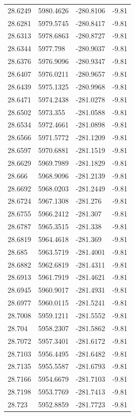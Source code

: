 \begin{table}[H]
\begin{tabular}{llll}
28.6249 & 5980.4626 & -280.8106 & -9.81 \\
28.6281 & 5979.5745 & -280.8417 & -9.81 \\
28.6313 & 5978.6863 & -280.8727 & -9.81 \\
28.6344 & 5977.798 & -280.9037 & -9.81 \\
28.6376 & 5976.9096 & -280.9347 & -9.81 \\
28.6407 & 5976.0211 & -280.9657 & -9.81 \\
28.6439 & 5975.1325 & -280.9968 & -9.81 \\
28.6471 & 5974.2438 & -281.0278 & -9.81 \\
28.6502 & 5973.355 & -281.0588 & -9.81 \\
28.6534 & 5972.4661 & -281.0898 & -9.81 \\
28.6566 & 5971.5772 & -281.1209 & -9.81 \\
28.6597 & 5970.6881 & -281.1519 & -9.81 \\
28.6629 & 5969.7989 & -281.1829 & -9.81 \\
28.666 & 5968.9096 & -281.2139 & -9.81 \\
28.6692 & 5968.0203 & -281.2449 & -9.81 \\
28.6724 & 5967.1308 & -281.276 & -9.81 \\
28.6755 & 5966.2412 & -281.307 & -9.81 \\
28.6787 & 5965.3515 & -281.338 & -9.81 \\
28.6819 & 5964.4618 & -281.369 & -9.81 \\
28.685 & 5963.5719 & -281.4001 & -9.81 \\
28.6882 & 5962.6819 & -281.4311 & -9.81 \\
28.6913 & 5961.7919 & -281.4621 & -9.81 \\
28.6945 & 5960.9017 & -281.4931 & -9.81 \\
28.6977 & 5960.0115 & -281.5241 & -9.81 \\
28.7008 & 5959.1211 & -281.5552 & -9.81 \\
28.704 & 5958.2307 & -281.5862 & -9.81 \\
28.7072 & 5957.3401 & -281.6172 & -9.81 \\
28.7103 & 5956.4495 & -281.6482 & -9.81 \\
28.7135 & 5955.5587 & -281.6793 & -9.81 \\
28.7166 & 5954.6679 & -281.7103 & -9.81 \\
28.7198 & 5953.7769 & -281.7413 & -9.81 \\
28.723 & 5952.8859 & -281.7723 & -9.81 \\

\end{tabular}
\end{table}
